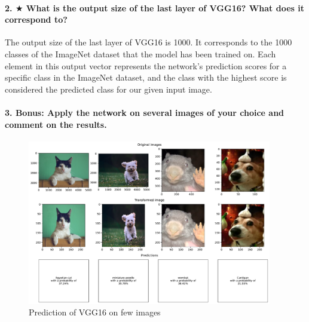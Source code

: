 







\paragraph{2. $\bigstar$ What is the output size of the last layer of VGG16? What does it correspond to?}
The output size of the last layer of VGG16 is 1000. It corresponds to the 1000 classes of the ImageNet dataset that the model has been trained on. Each element in this output vector represents  the network's prediction scores for a specific class in the ImageNet dataset, and the class with the highest score is considered the predicted class for our given input image.

\paragraph{3. \textbf{Bonus}: Apply the network on several images of your choice and comment on the results.}
\begin{figure}[H]
    \centering
    \includegraphics*[width=0.95\textwidth]{figs/2a/predictions.pdf}
    \caption{Prediction of VGG16 on few images}
\end{figure}

